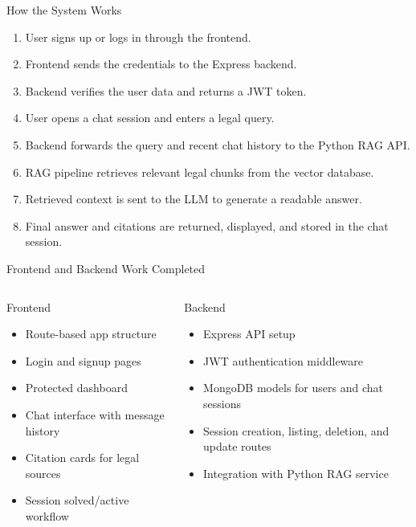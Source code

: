 \documentclass[aspectratio=169]{beamer}
\begin{document}
\begin{frame}{How the System Works}
  \begin{enumerate}
    \item User signs up or logs in through the frontend.
    \item Frontend sends the credentials to the Express backend.
    \item Backend verifies the user data and returns a JWT token.
    \item User opens a chat session and enters a legal query.
    \item Backend forwards the query and recent chat history to the Python RAG API.
    \item RAG pipeline retrieves relevant legal chunks from the vector database.
    \item Retrieved context is sent to the LLM to generate a readable answer.
    \item Final answer and citations are returned, displayed, and stored in the chat session.
  \end{enumerate}
\end{frame}

\begin{frame}{Frontend and Backend Work Completed}
  \begin{columns}[T]
    \begin{block}{Frontend}
      \begin{itemize}
        \item Route-based app structure
        \item Login and signup pages
        \item Protected dashboard
        \item Chat interface with message history
        \item Citation cards for legal sources
        \item Session solved/active workflow
      \end{itemize}
    \end{block}

    \begin{block}{Backend}
      \begin{itemize}
        \item Express API setup
        \item JWT authentication middleware
        \item MongoDB models for users and chat sessions
        \item Session creation, listing, deletion, and update routes
        \item Integration with Python RAG service
      \end{itemize}
    \end{block}
  \end{columns}
\end{frame}
\end{document}
